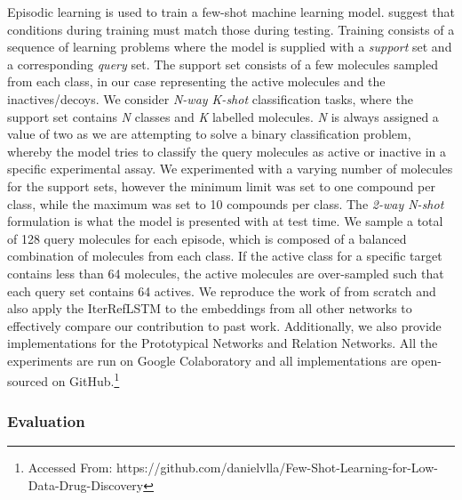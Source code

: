 Episodic learning is used to train a few-shot machine learning model. \citet{vinyals2016matching} suggest that conditions during training must match those during testing. Training consists of a sequence of learning problems where the model is supplied with a \textit{support} set and a corresponding \textit{query} set. The support set consists of a few molecules sampled from each class, in our case representing the active molecules and the inactives/decoys. We consider \textit{N-way K-shot} classification tasks, where the support set contains \textit{N} classes and \textit{K} labelled molecules. \textit{N} is always assigned a value of two as we are attempting to solve a binary classification problem, whereby the model tries to classify the query molecules as active or inactive in a specific experimental assay. We experimented with a varying number of molecules for the support sets, however the minimum limit was set to one compound per class, while the maximum was set to 10 compounds per class. The \textit{2-way N-shot} formulation is what the model is presented with at test time. We sample a total of 128 query molecules for each episode, which is composed of a balanced combination of molecules from each class. If the active class for a specific target contains less than 64 molecules, the active molecules are over-sampled such that each query set contains 64 actives. We reproduce the work of \citet{altae2017low} from scratch and also apply the IterRefLSTM to the embeddings from all other networks to effectively compare our contribution to past work. Additionally, we also provide implementations for the Prototypical Networks and Relation Networks. All the experiments are run on Google Colaboratory and all implementations are open-sourced on GitHub.\footnote{Accessed From: https://github.com/danielvlla/Few-Shot-Learning-for-Low-Data-Drug-Discovery}


\subsubsection{Evaluation}

